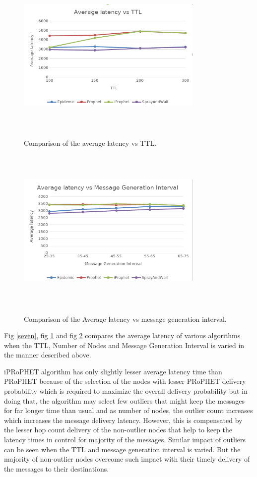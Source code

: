\documentclass[10pt,journal]{IEEEtran}
\begin{document}
\begin{figure}[H]
	\centering
	\includegraphics[width=9cm, height=8cm]{avg_lat_vs_ttl_n.png}\\
	\caption{Comparison of the average latency vs TTL.}
	\label{eleven}
\end{figure}

\begin{figure}[H]
	\centering
	\includegraphics[width=9cm, height=8cm]{avg_lat_vs_msg_gen_inter_n.png}\\
	\caption{Comparison of the Average latency vs message generation interval.}
	\label{twelve}
\end{figure}

Fig \ref{seven}, fig \ref{eleven} and fig \ref{twelve} compares the average latency of various algorithms when the TTL, Number of Nodes and Message Generation Interval is varied in the manner described above.

iPRoPHET algorithm has only slightly lesser average latency time than PRoPHET because of the selection of the nodes with lesser PRoPHET delivery probability which is required to maximize the overall delivery probability but in doing that, the algorithm may select few outliers that might keep the messages for far longer time than usual and as number of nodes, the outlier count increases which increases the message delivery latency. However, this is compensated by the lesser hop count delivery of the non-outlier nodes that help to keep the latency times in control for majority of the messages. Similar impact of outliers can be seen when the TTL and message generation interval is varied. But the majority of non-outlier nodes overcome such impact with their timely delivery of the messages to their destinations.
\end{document}
